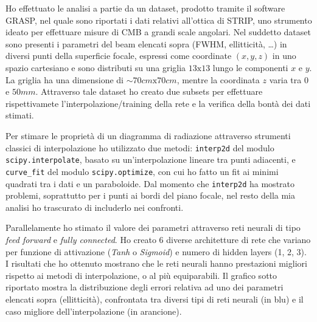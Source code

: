 \documentclass[12pt,a4paper,final]{report}			%
\begin{document}
Ho effettuato le analisi a partie da un dataset, prodotto tramite il software GRASP, nel quale sono riportati i dati relativi all'ottica di STRIP, uno strumento ideato per effettuare misure di CMB a grandi scale angolari.
Nel suddetto dataset sono presenti i parametri del beam elencati sopra (FWHM, ellitticità, \ldots) in diversi punti della superficie focale, espressi come coordinate $(x,y,z)$ in uno spazio cartesiano e sono distributi su una griglia $13\text{x}13$ lungo le componenti $x$ e $y$. La griglia ha una dimensione di $\sim 70 \unit{cm}\text{x}70 \unit{cm}$, mentre la coordinata $z$ varia tra $0$ e $50 \unit{mm}$.
Attraverso tale dataset ho creato due subsets per effettuare rispettivamete l'interpolazione/training della rete e la verifica della bontà dei dati stimati.

Per stimare le proprietà di un diagramma di radiazione attraverso strumenti classici di interpolazione ho utilizzato due metodi: \texttt{interp2d} del modulo \texttt{scipy.interpolate}, basato su un'interpolazione lineare tra punti adiacenti, e \texttt{curve\_fit} del modulo \texttt{scipy.optimize}, con cui ho fatto un fit ai minimi quadrati tra i dati e un paraboloide. Dal momento che \texttt{interp2d} ha mostrato problemi, soprattutto per i punti ai bordi del piano focale, nel resto della mia analisi ho trascurato di includerlo nei confronti.


Parallelamente ho stimato il valore dei parametri attraverso reti neurali di tipo \textit{feed forward} e \textit{fully connected}.
Ho creato 6 diverse architetture di rete che variano per funzione di attivazione (\textit{Tanh} o \textit{Sigmoid}) e numero di hidden layers (1, 2, 3). 
I risultati che ho ottenuto mostrano che le reti neurali hanno prestazioni migliori rispetto ai metodi di interpolazione, o al più equiparabili.
Il grafico sotto riportato mostra la distribuzione degli errori relativa ad uno dei parametri elencati sopra (ellitticità), confrontata tra diversi tipi di reti neurali (in blu) e il caso migliore dell'interpolazione (in arancione).
\end{document}
